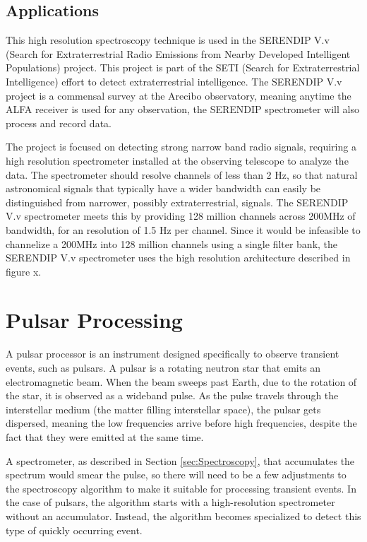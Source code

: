 \subsection{Applications}

This high resolution spectroscopy technique is used in the SERENDIP V.v (Search for Extraterrestrial Radio Emissions from Nearby Developed Intelligent Populations) project. 
This project is part of the SETI (Search for Extraterrestrial Intelligence) effort to detect extraterrestrial intelligence. 
The SERENDIP V.v project is a commensal survey at the Arecibo observatory, meaning anytime the ALFA receiver is used for any observation, the SERENDIP spectrometer will also process and record data. %

The project is focused on detecting strong narrow band radio signals, requiring a high resolution spectrometer installed at the observing telescope to analyze the data. 
The spectrometer should resolve channels of less than 2 Hz, so that natural astronomical signals that typically have a wider bandwidth can easily be distinguished from narrower, possibly extraterrestrial, signals. 
The SERENDIP V.v spectrometer meets this by providing 128 million channels across 200MHz of bandwidth, for an resolution of 1.5 Hz per channel. 
Since it would be infeasible to channelize a 200MHz into 128 million channels using a single filter bank, the SERENDIP V.v spectrometer uses the high resolution architecture described in figure x. %




\section{Pulsar Processing}
A pulsar processor is an instrument designed specifically to observe transient events, such as pulsars. 
A pulsar is a rotating neutron star that emits an electromagnetic beam. 
When the beam sweeps past Earth, due to the rotation of the star, it is observed as a wideband pulse. 
As the pulse travels through the interstellar medium (the matter filling interstellar space), the pulsar gets dispersed, meaning the low frequencies arrive before high frequencies, despite the fact that they were emitted at the same time. 

A spectrometer, as described in Section \ref{sec:Spectroscopy}, that accumulates the spectrum would smear the pulse, so there will need to be a few adjustments to the spectroscopy algorithm to make it suitable for processing transient events. 
In the case of pulsars, the algorithm starts with a high-resolution spectrometer without an accumulator. 
Instead, the algorithm becomes specialized to detect this type of quickly occurring event.

